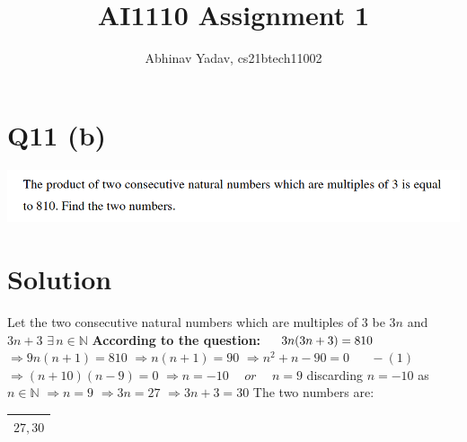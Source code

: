 \documentclass[11pt, letterpaper]{article}
\title{AI1110 Assignment 1}
\author{Abhinav Yadav, cs21btech11002}
\begin{document}
    \maketitle
    \section*{Q11 (b)}
    \includegraphics[width=\textwidth]{q11_b.png}\newline
    \section*{Solution}
    Let the two consecutive natural numbers which are multiples of $3$ be $3n$ and $3n+3$
    \hspace{5pt} $\exists \hspace{2pt} n \in \mathbb{N}$
    \newline
    \textbf{According to the question:}\newline
    $\hspace*{12pt} 3n(3n+3) = 810$\newline
    $\Rightarrow 9n(n+1)=810$\newline
    $\Rightarrow n(n+1)=90$\newline
    $\Rightarrow n^2+n-90=0\hspace{20pt} -(1)$\newline
    $\Rightarrow (n+10)(n-9)=0$\newline
    $\Rightarrow n=-10 \hspace{15pt} or \hspace{15pt} n=9$\newline\newline
    \hspace*{11pt} discarding $n=-10$ as $n \in \mathbb{N}$\newline\newline
    $\Rightarrow n=9$\newline
    $\Rightarrow 3n=27$\newline
    $\Rightarrow 3n+3=30$\newline\newline
    The two numbers are:\newline
    \begin{tabular}{|c|}
        \hline
            $27, 30$\\
        \hline
    \end{tabular}\newline\newline\newline
\end{document}
